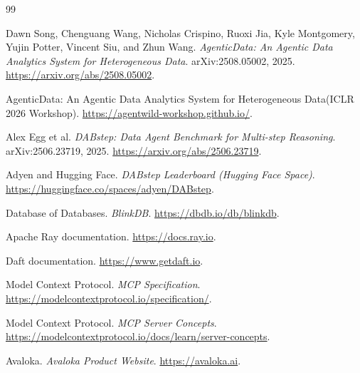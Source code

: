 \documentclass{article} %
\begin{document}
\begin{thebibliography}{99}

Dawn Song, Chenguang Wang, Nicholas Crispino, Ruoxi Jia, Kyle Montgomery, Yujin Potter,
Vincent Siu, and Zhun Wang.
\newblock \emph{AgenticData: An Agentic Data Analytics System for Heterogeneous Data}.
\newblock arXiv:2508.05002, 2025. \url{https://arxiv.org/abs/2508.05002}.

AgenticData: An Agentic Data Analytics System for Heterogeneous Data(ICLR 2026 Workshop).
\newblock \url{https://agentwild-workshop.github.io/}.

Alex Egg et al.
\newblock \emph{DABstep: Data Agent Benchmark for Multi-step Reasoning}.
\newblock arXiv:2506.23719, 2025. \url{https://arxiv.org/abs/2506.23719}.

Adyen and Hugging Face.
\newblock \emph{DABstep Leaderboard (Hugging Face Space)}.
\newblock \url{https://huggingface.co/spaces/adyen/DABstep}.

Database of Databases.
\newblock \emph{BlinkDB}.
\newblock \url{https://dbdb.io/db/blinkdb}.

Apache Ray documentation.
\newblock \url{https://docs.ray.io}.

Daft documentation.
\newblock \url{https://www.getdaft.io}.

Model Context Protocol.
\newblock \emph{MCP Specification}.
\newblock \url{https://modelcontextprotocol.io/specification/}.

Model Context Protocol.
\newblock \emph{MCP Server Concepts}.
\newblock \url{https://modelcontextprotocol.io/docs/learn/server-concepts}.

Avaloka.
\newblock \emph{Avaloka Product Website}.
\newblock \url{https://avaloka.ai}.

\end{thebibliography}
\end{document}

